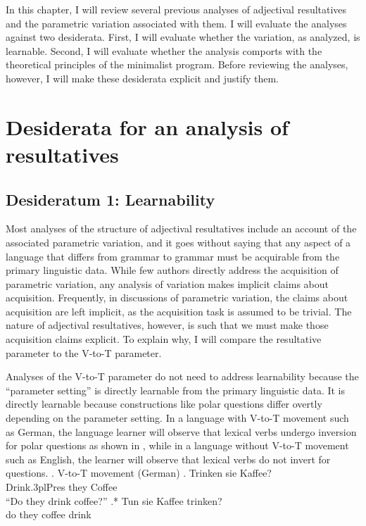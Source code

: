 In this chapter, I will review several previous analyses of adjectival resultatives and the parametric variation associated with them.
I will evaluate the analyses against two desiderata.
First, I will evaluate whether the variation, as analyzed, is learnable.
Second, I will evaluate whether the analysis comports with the theoretical principles of the minimalist program.
Before reviewing the analyses, however, I will make these desiderata explicit and justify them.

\section{Desiderata for an analysis of resultatives}

\subsection{Desideratum 1: Learnability}
Most analyses of the structure of adjectival resultatives include an account of the associated parametric variation, and it goes without saying that any aspect of a language that differs from grammar to grammar must be acquirable from the primary linguistic data.
While few authors directly address the acquisition of parametric variation, any analysis of variation makes implicit claims about acquisition.
Frequently, in discussions of parametric variation, the claims about acquisition are left implicit, as the acquisition task is assumed to be trivial.
The nature of adjectival resultatives, however, is such that we must make those acquisition claims explicit.
To explain why, I will compare the resultative parameter to the V-to-T parameter.

Analyses of the V-to-T parameter do not need to address learnability because the ``parameter setting'' is directly learnable from the primary linguistic data.
It is directly learnable because constructions like polar questions differ overtly depending on the parameter setting.
In a language with V-to-T movement such as German, the language learner will observe that lexical verbs undergo inversion for polar questions as shown in \Next, while in a language without V-to-T movement such as English, the learner will observe that lexical verbs do not invert for questions.
\ex. V-to-T movement (German)
\ag. Trinken sie Kaffee?\\
Drink.3plPres they Coffee\\
``Do they drink coffee?''
\bg.* Tun sie Kaffee trinken?\\
do they coffee drink\\

